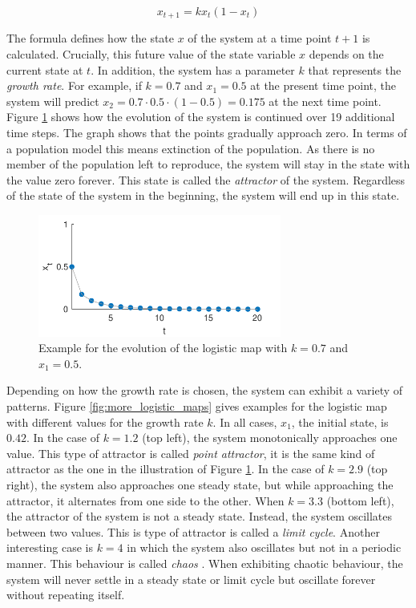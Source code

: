 \begin{equation}
x_{t+1} = kx_t(1-x_t)
\label{eq:logistic_map}
\end{equation}

The formula defines how the state $x$ of the system at a time point $t+1$ is calculated. Crucially, this future value of the state variable $x$ depends on the current state at $t$. In addition, the system has a parameter $k$ that represents the \emph{growth rate}. For example, if $k = 0.7$ and $x_1 = 0.5$ at the present time point, the system will predict $x_2 = 0.7 \cdot 0.5 \cdot (1-0.5) = 0.175$ at the next time point. Figure \ref{fig:logistic_map} shows how the evolution of the system is continued over 19 additional time steps. The graph shows that the points gradually approach zero. In terms of a population model this means extinction of the population. As there is no member of the population left to reproduce, the system will stay in the state with the value zero forever. This state is called the \emph{attractor} of the system. Regardless of the state of the system in the beginning, the system will end up in this state.

\begin{figure}[htp]
\begin{center}
\includegraphics[width=8cm]{figures/ch3/logistic_map.pdf}
\caption{Example for the evolution of the logistic map with $k = 0.7$ and $x_1 = 0.5$.}
\label{fig:logistic_map}
\end{center}
\end{figure}

Depending on how the growth rate is chosen, the system can exhibit a variety of patterns. Figure \ref{fig:more_logistic_maps} gives examples for the logistic map with different values for the growth rate $k$. In all cases, $x_1$, the initial state, is $0.42$. In the case of $k = 1.2$ (top left), the system monotonically approaches one value. This type of attractor is called \emph{point attractor}, it is the same kind of attractor as the one in the illustration of Figure \ref{fig:logistic_map}. In the case of $k = 2.9$ (top right), the system also approaches one steady state, but while approaching the attractor, it alternates from one side to the other. When $k = 3.3$ (bottom left), the attractor of the system is not a steady state. Instead, the system oscillates between two values. This is type of attractor is called a \emph{limit cycle}. Another interesting case is $k = 4$ in which the system also oscillates but not in a periodic manner. This behaviour is called \emph{chaos} \citep{KaplanGlass1995}. When exhibiting chaotic behaviour, the system will never settle in a steady state or limit cycle but oscillate forever without repeating itself. 

